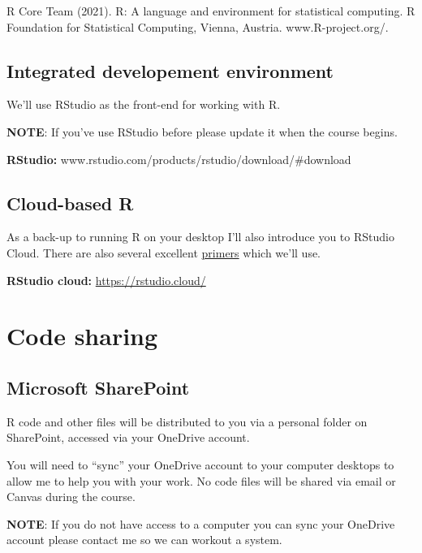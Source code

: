 \documentclass[
]{book}
\begin{document}
R Core Team (2021). R: A language and environment for statistical computing. R Foundation for Statistical Computing, Vienna, Austria. www.R-project.org/.

\hypertarget{integrated-developement-environment}{%
\subsection{Integrated developement environment}\label{integrated-developement-environment}}

We'll use RStudio as the front-end for working with R.

\textbf{NOTE}: If you've use RStudio before please update it when the course begins.

\textbf{RStudio:} www.rstudio.com/products/rstudio/download/\#download

\hypertarget{cloud-based-r}{%
\subsection{Cloud-based R}\label{cloud-based-r}}

As a back-up to running R on your desktop I'll also introduce you to RStudio Cloud. There are also several excellent \href{https://rstudio.cloud/learn/primers}{primers} which we'll use.

\textbf{RStudio cloud:} \url{https://rstudio.cloud/}

\hypertarget{code-sharing}{%
\section{Code sharing}\label{code-sharing}}

\hypertarget{microsoft-sharepoint}{%
\subsection{Microsoft SharePoint}\label{microsoft-sharepoint}}

R code and other files will be distributed to you via a personal folder on SharePoint, accessed via your OneDrive account.

You will need to ``sync'' your OneDrive account to your computer desktops to allow me to help you with your work. No code files will be shared via email or Canvas during the course.

\textbf{NOTE}: If you do not have access to a computer you can sync your OneDrive account please contact me so we can workout a system.
\end{document}
